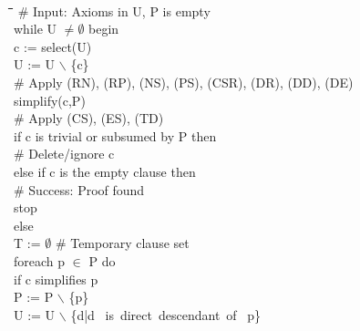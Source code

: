 \documentclass{article}
\begin{document}
\begin{figure}[hp]
  \begin{center}
    \tt
    \begin{tabbing}
      \quad\quad \= \quad\quad \= \quad\quad \=  \quad\quad \= \quad\quad \= \kill
      \# Input: Axioms in U, P is empty\\
      while U $\not= \emptyset{}$ begin\+\\
        c := select(U)\\
        U := U $\backslash$ \{c\}\\

        \# Apply (RN), (RP), (NS), (PS), (CSR), (DR), (DD), (DE)\\
        simplify(c,P)\\
        \# Apply (CS), (ES), (TD)\\
        if c is trivial or subsumed by P then\+\\
          \# Delete/ignore c\-\\
        else if c is the empty clause then\+\\
          \# Success: Proof found\\
          stop\-\\
        else\+\\
          T := $\emptyset{}$ \# Temporary clause set\\
          foreach p $\in$ P do\+\\
            if c simplifies p \+\\
              P := P $\backslash$ \{p\}\\
              U := U $\backslash$ \{d|d \mbox{ is direct descendant of } p\}\\ 


\end{tabbing}
\end{center}
\end{figure}
\end{document}
